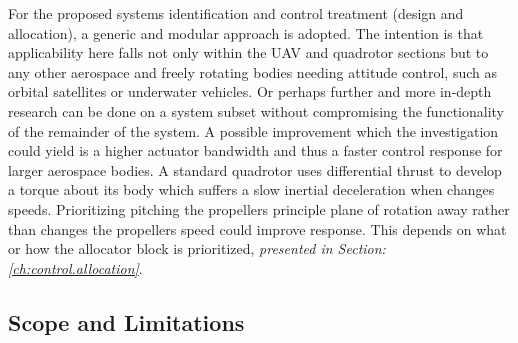 \par
For the proposed systems identification and control treatment (design and allocation), a generic and modular approach is adopted. The intention is that applicability here falls not only within the UAV and quadrotor sections but to any other aerospace and freely rotating bodies needing attitude control, such as orbital satellites or underwater vehicles. Or perhaps further and more in-depth research can be done on a system subset without compromising the functionality of the remainder of the system. A possible improvement which the investigation could yield is a higher actuator bandwidth and thus a faster control response for larger aerospace bodies. A standard quadrotor uses differential thrust to develop a torque about its body which suffers a slow inertial deceleration when changes speeds. Prioritizing pitching the propellers principle plane of rotation away rather than changes the propellers speed could improve response. This depends on what or how the allocator block is prioritized, \emph{presented in Section:\ref{ch:control.allocation}}.
\subsection{Scope and Limitations}
\label{subsec:intro.foreward.scopeandlim}
